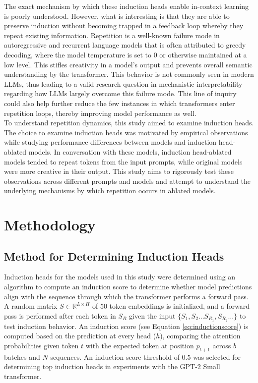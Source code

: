 \documentclass[twocolumn]{article}
\begin{document}
The exact mechanism by which these induction heads enable in-context learning is poorly understood. However, what is interesting is that they are able to preserve induction without becoming trapped in a feedback loop whereby they repeat existing information. Repetition is a well-known failure mode in autoregressive and recurrent language models that is often attributed to greedy decoding, where the model temperature is set to 0 or otherwise maintained at a low level. This stifles creativity in a model's output and prevents overall semantic understanding by the transformer. This behavior is not commonly seen in modern LLMs, thus leading to a valid research question in mechanistic interpretability regarding how LLMs largely overcome this failure mode. This line of inquiry could also help further reduce the few instances in which transformers enter repetition loops, thereby improving model performance as well. \\

To understand repetition dynamics, this study aimed to examine induction heads. The choice to examine induction heads was motivated by empirical observations while studying performance differences between models and induction head-ablated models. In conversation with these models, induction head-ablated models tended to repeat tokens from the input prompts, while original models were more creative in their output. This study aims to rigorously test these observations across different prompts and models and attempt to understand the underlying mechanisms by which repetition occurs in ablated models.

\section{Methodology}

\subsection{Method for Determining Induction Heads}

Induction heads for the models used in this study were determined using an algorithm to compute an induction score to determine whether model predictions align with the sequence through which the transformer performs a forward pass. A random matrix $S \in \mathbb{R}^{L \times H}$ of 50 token embeddings is initialized, and a forward pass is performed after each token in $S_R$ given the input $\{ S_1, S_2 \dots S_{R_1}, S_{R_2} \dots\}$ to test induction behavior. An induction score (see Equation \ref{eq:inductionscore}) is computed based on the prediction at every head ($h$), comparing the attention probabilities given token $t$ with the expected token at position $p_{t+1}$ across $b$ batches and $N$ sequences. An induction score threshold of 0.5 was selected for determining top induction heads in experiments with the GPT-2 Small transformer. 
\end{document}
